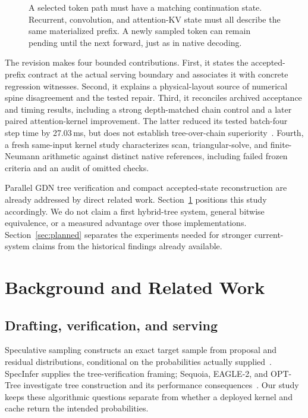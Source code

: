 \documentclass[conference]{IEEEtran}
\begin{document}
\begin{figure}[t]
\centering

\caption{A selected token path must have a matching continuation state. Recurrent, convolution, and attention-KV state must all describe the same materialized prefix. A newly sampled token can remain pending until the next forward, just as in native decoding.}
\label{fig:contract}
\end{figure}

The revision makes four bounded contributions. First, it states the accepted-prefix contract at the actual serving boundary and associates it with concrete regression witnesses. Second, it explains a physical-layout source of numerical spine disagreement and the tested repair. Third, it reconciles archived acceptance and timing results, including a strong depth-matched chain control and a later paired attention-kernel improvement. The latter reduced its tested batch-four step time by 27.03\,ms, but does not establish tree-over-chain superiority~\cite{lumo2026paired}. Fourth, a fresh same-input kernel study characterizes scan, triangular-solve, and finite-Neumann arithmetic against distinct native references, including failed frozen criteria and an audit of omitted checks.

Parallel GDN tree verification and compact accepted-state reconstruction are already addressed by direct related work. Section~\ref{sec:related} positions this study accordingly. We do not claim a first hybrid-tree system, general bitwise equivalence, or a measured advantage over those implementations. Section~\ref{sec:planned} separates the experiments needed for stronger current-system claims from the historical findings already available.

\section{Background and Related Work}
\label{sec:related}
\subsection{Drafting, verification, and serving}
Speculative sampling constructs an exact target sample from proposal and residual distributions, conditional on the probabilities actually supplied~\cite{leviathan2023fast,chen2023sampling}. SpecInfer supplies the tree-verification framing; Sequoia, EAGLE-2, and OPT-Tree investigate tree construction and its performance consequences~\cite{miao2023specinfer,chen2024sequoia,li2024eagle,wang2024opt}. Our study keeps these algorithmic questions separate from whether a deployed kernel and cache return the intended probabilities.
\end{document}
